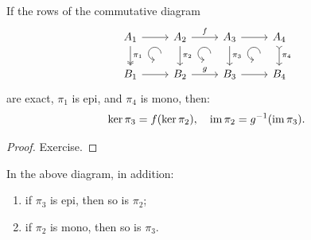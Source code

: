 \begin{lem}[4-lemma]
    If the rows of the commutative diagram
    \[\begin{tikzcd}[every matrix/.append style={name=m},   
        execute at end picture={\draw [<-] ([xshift=-8mm,yshift=-10mm]m-1-2.north) arc[start angle=-90,delta angle=-270,radius=0.2cm];
        \draw [<-] ([xshift=-8mm,yshift=-10mm]m-1-3.north) arc[start angle=-90,delta angle=-270,radius=0.2cm];
        \draw [<-] ([xshift=-8mm,yshift=-10mm]m-1-4.north) arc[start angle=-90,delta angle=-270,radius=0.2cm];}]
        A_1\arrow[r]\arrow[d,two heads,"\pi_1"] & A_2\arrow[r,"f"]\arrow[d,"\pi_2"] & A_3 \arrow[r]\arrow[d,"\pi_3"] & A_4\arrow[d,tail,"\pi_4"] \\
       B_1\arrow[r] & B_2\arrow[r,"g"] & B_3\arrow[r] &B_4
    \end{tikzcd}\]
    are exact, $\pi_1$ is epi, and $\pi_4$ is mono, then:
    \[\ker\pi_3=f(\ker\pi_2),\quad \operatorname{im}\pi_2=g^{-1}(\operatorname{im} \pi_3).\]
\end{lem}
\begin{proof}
    Exercise.
\end{proof}
\begin{cor}
    In the above diagram, in addition:
    \begin{enumerate}
        \item if $\pi_3$ is epi, then so is $\pi_2$;
        \item if $\pi_2$ is mono, then so is $\pi_3$.
    \end{enumerate}
\end{cor}

